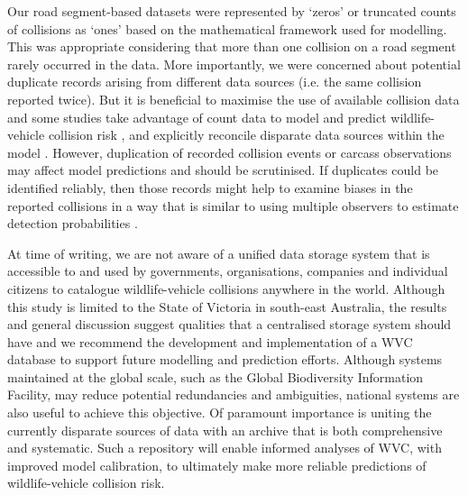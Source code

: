 Our road segment-based datasets were represented by `zeros' or truncated counts of collisions as `ones' based on the mathematical framework used for modelling. This was appropriate considering that more than one collision on a road segment rarely occurred in the data. More importantly, we were concerned about potential duplicate records arising from different data sources (i.e. the same collision reported twice). But it is beneficial to maximise the use of available collision data and some studies take advantage of count data to model and predict wildlife-vehicle collision risk \citep[e.g.][]{cser13}, and explicitly reconcile disparate data sources within the model \citep[e.g.][]{lao11a}. However, duplication of recorded collision events or carcass observations may affect model predictions and should be scrutinised. If duplicates could be identified reliably, then those records might help to examine biases in the reported collisions in a way that is similar to using multiple observers to estimate detection probabilities \citep[see][]{nich00}.

At time of writing, we are not aware of a unified data storage system that is accessible to and used by governments, organisations, companies and individual citizens to catalogue wildlife-vehicle collisions anywhere in the world. Although this study is limited to the State of Victoria in south-east Australia, the results and general discussion suggest qualities that a centralised storage system should have and we recommend the development and implementation of a WVC database to support future modelling and prediction efforts. Although systems maintained at the global scale, such as the Global Biodiversity Information Facility, may reduce potential redundancies and ambiguities, national systems are also useful to achieve this objective. Of paramount importance is uniting the currently disparate sources of data with an archive that is both comprehensive and systematic. Such a repository will enable informed analyses of WVC, with improved model calibration, to ultimately make more reliable predictions of wildlife-vehicle collision risk. 

